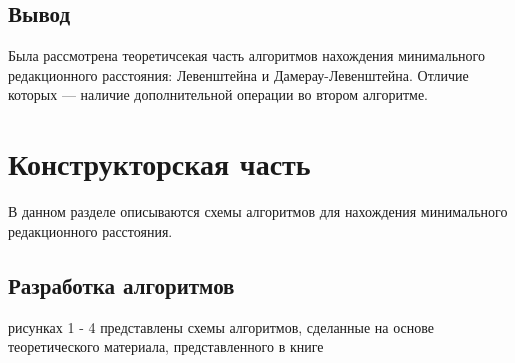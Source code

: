 \documentclass[12pt,a4paper,oneside]{report}
\begin{document}
\section*{Вывод}
\qquad Была рассмотрена теоретичсекая часть алгоритмов нахождения минимального редакционного расстояния: Левенштейна и Дамерау-Левенштейна.  Отличие которых — наличие дополнительной операции во втором алгоритме. 
\clearpage


\chapter{Конструкторская часть}
\qquad В данном разделе описываются схемы алгоритмов для нахождения минимального редакционного расстояния.
\section{Разработка алгоритмов}
 рисунках 1 - 4 представлены схемы алгоритмов, сделанные на основе теоретического материала, представленного в книге \cite{Gasfild}
\end{document}
